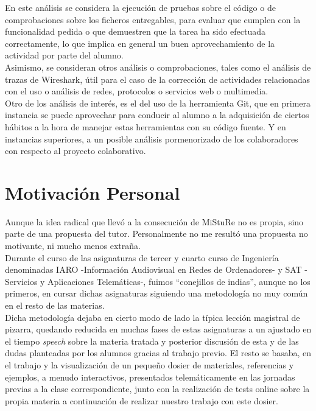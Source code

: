 En este análisis se considera la ejecución de pruebas sobre el código o de comprobaciones sobre los ficheros entregables, para evaluar que cumplen con la funcionalidad pedida o que demuestren que la tarea ha sido efectuada correctamente, lo que implica en general un buen aprovechamiento de la actividad por parte del alumno.\\


Asimismo,  se consideran otros análisis o comprobaciones, tales como el análisis de trazas de Wireshark, útil para el caso de la corrección de actividades relacionadas con el uso o análisis de redes, protocolos o servicios web o multimedia.\\


Otro de los análisis de interés, es el del uso de la herramienta Git, que en primera instancia se puede aprovechar para conducir al alumno a la adquisición de ciertos hábitos a la hora de manejar estas herramientas con su código fuente. Y en instancias superiores, a un posible análisis pormenorizado de los colaboradores con respecto al proyecto colaborativo.\\


\section{Motivación Personal}

Aunque la idea radical que llevó a la consecución de MiStuRe no es propia, sino parte de una propuesta del tutor. Personalmente no me resultó una propuesta no motivante, ni mucho menos extraña.\\


Durante el curso de las asignaturas de tercer y cuarto curso de Ingeniería denominadas IARO -Información Audiovisual en Redes de Ordenadores- y SAT -Servicios y Aplicaciones Telemáticas-, fuimos ``conejillos de indias'', aunque no los primeros, en cursar dichas asignaturas siguiendo una metodología no muy común en el resto de las materias.\\


Dicha metodología dejaba en cierto modo de lado la típica lección magistral de pizarra, quedando reducida en muchas fases de estas asignaturas a un ajustado en el tiempo \textit{speech} sobre la materia tratada y posterior discusión de esta y de las dudas planteadas por los alumnos gracias al trabajo previo. El resto se basaba, en el trabajo y la visualización de un pequeño dosier de materiales, referencias y ejemplos, a menudo interactivos, presentados telemáticamente en las jornadas previas a la clase correspondiente, junto con la realización de tests online sobre la propia materia a continuación de realizar nuestro trabajo con este dosier.\\


